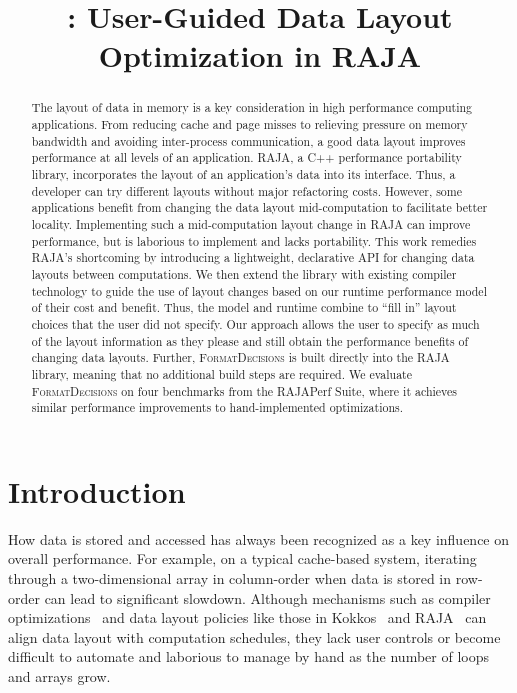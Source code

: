 \documentclass[sigconf,review=true]{acmart}
\title{\FormatDecisions{}: User-Guided Data Layout Optimization in RAJA}
\newcommand{\FormatDecisions}[0]{{\textsc{FormatDecisions}}}
\begin{document}
\begin{abstract}

The layout of data in memory is a key consideration in high performance computing applications.
From reducing cache and page misses to relieving pressure on memory bandwidth and avoiding inter-process communication, a good data layout improves performance at all levels of an application.
RAJA, a C++ performance portability library, incorporates the layout of an application's data into its interface.
Thus, a developer can try different layouts without major refactoring costs.
However, some applications benefit from changing the data layout mid-computation to facilitate better locality.
Implementing such a mid-computation layout change in RAJA can improve performance, but is laborious to implement and lacks portability.
This work remedies RAJA's shortcoming by introducing a lightweight, declarative API for changing data layouts between computations.
We then extend the library with existing compiler technology to guide the use of layout changes based on our runtime performance model of their cost and benefit.
Thus, the model and runtime combine to \enquote{fill in} layout choices that the user did not specify.
Our approach allows the user to specify as much of the layout information as they please and still obtain the performance benefits of changing data layouts.  
Further, \FormatDecisions{} is built directly into the RAJA library, meaning that no additional build steps are required.
We evaluate \FormatDecisions{} on four benchmarks from the RAJAPerf Suite, where it achieves similar performance improvements to hand-implemented optimizations.
\end{abstract}
\maketitle
\def\@textbottom{\vskip \z@ \@plus 1pt}




\section{Introduction}

How data is stored and accessed has always been recognized as a key influence on overall performance.
For example, on a typical cache-based system, iterating through a two-dimensional array in column-order when data is 
stored in row-order can lead to significant slowdown. 
Although mechanisms such as compiler optimizations~\cite{wolf1991data,bixby1994automatic}
and data layout policies like those in Kokkos~\cite{edwards2014kokkos} and RAJA~\cite{hornung2014RAJA} can align data layout with computation schedules, they lack user controls or become difficult to automate and laborious to manage by hand as the number of loops and arrays grow.
\end{document}
